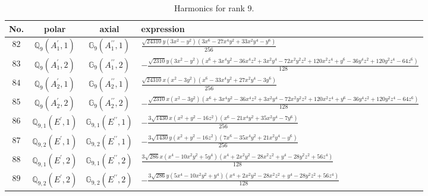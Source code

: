 \documentclass[fleqn,8pt,landscape]{jsarticle}
\begin{document}
\begin{table}[ht!]
\begin{center}
\caption{Harmonics for rank 9.}
\renewcommand{\arraystretch}{1.3}
\begin{tabular}{cccl} \hline \hline
No. & polar & axial & expression \\ \hline
$ 82 $ & $ \mathbb{Q}_{9}(A_{1}^{\prime},1) $ & $ \mathbb{G}_{9}(A_{1}^{\prime\prime},1) $ & $ \frac{\sqrt{24310} y \left(3 x^{2} - y^{2}\right) \left(3 x^{6} - 27 x^{4} y^{2} + 33 x^{2} y^{4} - y^{6}\right)}{256} $ \\
$ 83 $ & $ \mathbb{Q}_{9}(A_{1}^{\prime},2) $ & $ \mathbb{G}_{9}(A_{1}^{\prime\prime},2) $ & $ - \frac{\sqrt{2310} y \left(3 x^{2} - y^{2}\right) \left(x^{6} + 3 x^{4} y^{2} - 36 x^{4} z^{2} + 3 x^{2} y^{4} - 72 x^{2} y^{2} z^{2} + 120 x^{2} z^{4} + y^{6} - 36 y^{4} z^{2} + 120 y^{2} z^{4} - 64 z^{6}\right)}{128} $ \\
$ 84 $ & $ \mathbb{Q}_{9}(A_{2}^{\prime},1) $ & $ \mathbb{G}_{9}(A_{2}^{\prime\prime},1) $ & $ \frac{\sqrt{24310} x \left(x^{2} - 3 y^{2}\right) \left(x^{6} - 33 x^{4} y^{2} + 27 x^{2} y^{4} - 3 y^{6}\right)}{256} $ \\
$ 85 $ & $ \mathbb{Q}_{9}(A_{2}^{\prime},2) $ & $ \mathbb{G}_{9}(A_{2}^{\prime\prime},2) $ & $ - \frac{\sqrt{2310} x \left(x^{2} - 3 y^{2}\right) \left(x^{6} + 3 x^{4} y^{2} - 36 x^{4} z^{2} + 3 x^{2} y^{4} - 72 x^{2} y^{2} z^{2} + 120 x^{2} z^{4} + y^{6} - 36 y^{4} z^{2} + 120 y^{2} z^{4} - 64 z^{6}\right)}{128} $ \\
$ 86 $ & $ \mathbb{Q}_{9,1}(E^{\prime},1) $ & $ \mathbb{G}_{9,1}(E^{\prime\prime},1) $ & $ - \frac{3 \sqrt{1430} x \left(x^{2} + y^{2} - 16 z^{2}\right) \left(x^{6} - 21 x^{4} y^{2} + 35 x^{2} y^{4} - 7 y^{6}\right)}{256} $ \\
$ 87 $ & $ \mathbb{Q}_{9,2}(E^{\prime},1) $ & $ \mathbb{G}_{9,2}(E^{\prime\prime},1) $ & $ - \frac{3 \sqrt{1430} y \left(x^{2} + y^{2} - 16 z^{2}\right) \left(7 x^{6} - 35 x^{4} y^{2} + 21 x^{2} y^{4} - y^{6}\right)}{256} $ \\
$ 88 $ & $ \mathbb{Q}_{9,1}(E^{\prime},2) $ & $ \mathbb{G}_{9,1}(E^{\prime\prime},2) $ & $ \frac{3 \sqrt{286} x \left(x^{4} - 10 x^{2} y^{2} + 5 y^{4}\right) \left(x^{4} + 2 x^{2} y^{2} - 28 x^{2} z^{2} + y^{4} - 28 y^{2} z^{2} + 56 z^{4}\right)}{128} $ \\
$ 89 $ & $ \mathbb{Q}_{9,2}(E^{\prime},2) $ & $ \mathbb{G}_{9,2}(E^{\prime\prime},2) $ & $ - \frac{3 \sqrt{286} y \left(5 x^{4} - 10 x^{2} y^{2} + y^{4}\right) \left(x^{4} + 2 x^{2} y^{2} - 28 x^{2} z^{2} + y^{4} - 28 y^{2} z^{2} + 56 z^{4}\right)}{128} $ \\

\end{tabular}
\end{center}
\end{table}
\end{document}
